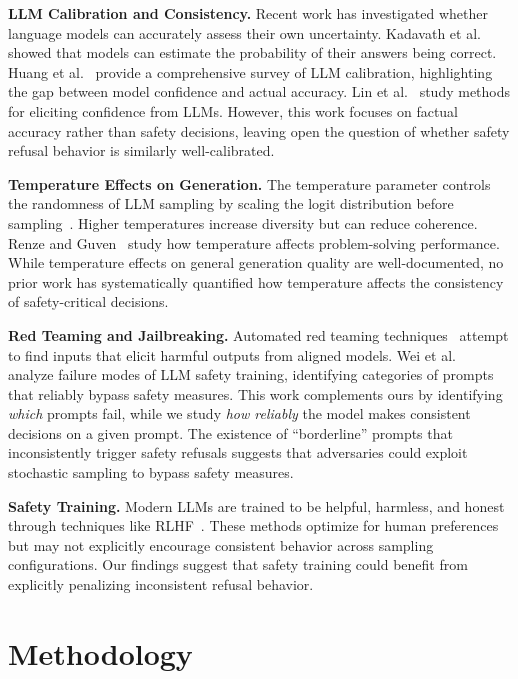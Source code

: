 \documentclass[11pt]{article}
\begin{document}
\textbf{LLM Calibration and Consistency.} Recent work has investigated whether language models can accurately assess their own uncertainty. Kadavath et al.~\cite{kadavath2022language} showed that models can estimate the probability of their answers being correct. Huang et al.~\cite{huang2024survey} provide a comprehensive survey of LLM calibration, highlighting the gap between model confidence and actual accuracy. Lin et al.~\cite{lin2024generating} study methods for eliciting confidence from LLMs. However, this work focuses on factual accuracy rather than safety decisions, leaving open the question of whether safety refusal behavior is similarly well-calibrated.

\textbf{Temperature Effects on Generation.} The temperature parameter controls the randomness of LLM sampling by scaling the logit distribution before sampling~\cite{holtzman2020curious}. Higher temperatures increase diversity but can reduce coherence. Renze and Guven~\cite{renze2024temperature} study how temperature affects problem-solving performance. While temperature effects on general generation quality are well-documented, no prior work has systematically quantified how temperature affects the consistency of safety-critical decisions.

\textbf{Red Teaming and Jailbreaking.} Automated red teaming techniques~\cite{perez2022red, ganguli2022red} attempt to find inputs that elicit harmful outputs from aligned models. Wei et al.~\cite{wei2024jailbroken} analyze failure modes of LLM safety training, identifying categories of prompts that reliably bypass safety measures. This work complements ours by identifying \textit{which} prompts fail, while we study \textit{how reliably} the model makes consistent decisions on a given prompt. The existence of ``borderline'' prompts that inconsistently trigger safety refusals suggests that adversaries could exploit stochastic sampling to bypass safety measures.

\textbf{Safety Training.} Modern LLMs are trained to be helpful, harmless, and honest through techniques like RLHF~\cite{ouyang2022training, bai2022training}. These methods optimize for human preferences but may not explicitly encourage consistent behavior across sampling configurations. Our findings suggest that safety training could benefit from explicitly penalizing inconsistent refusal behavior.

\section{Methodology}
\end{document}
